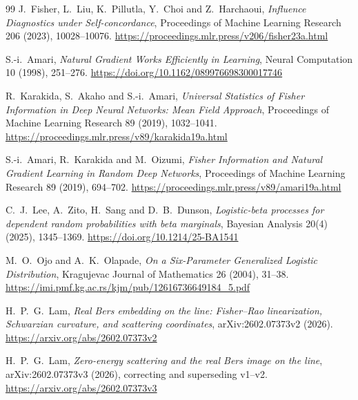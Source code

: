 \documentclass[11pt]{article}
\begin{document}
\begin{thebibliography}{99}
J.~Fisher, L.~Liu, K.~Pillutla, Y.~Choi and Z.~Harchaoui,
\emph{Influence Diagnostics under Self-concordance},
Proceedings of Machine Learning Research 206 (2023), 10028--10076.
\url{https://proceedings.mlr.press/v206/fisher23a.html}

S.-i.~Amari,
\emph{Natural Gradient Works Efficiently in Learning},
Neural Computation 10 (1998), 251--276.
\url{https://doi.org/10.1162/089976698300017746}

R.~Karakida, S.~Akaho and S.-i.~Amari,
\emph{Universal Statistics of Fisher Information in Deep Neural Networks: Mean Field Approach},
Proceedings of Machine Learning Research 89 (2019), 1032--1041.
\url{https://proceedings.mlr.press/v89/karakida19a.html}

S.-i.~Amari, R.~Karakida and M.~Oizumi,
\emph{Fisher Information and Natural Gradient Learning in Random Deep Networks},
Proceedings of Machine Learning Research 89 (2019), 694--702.
\url{https://proceedings.mlr.press/v89/amari19a.html}

C.~J.~Lee, A.~Zito, H.~Sang and D.~B.~Dunson,
\emph{Logistic-beta processes for dependent random probabilities with beta marginals},
Bayesian Analysis 20(4) (2025), 1345--1369.
\url{https://doi.org/10.1214/25-BA1541}

M.~O.~Ojo and A.~K.~Olapade,
\emph{On a Six-Parameter Generalized Logistic Distribution},
Kragujevac Journal of Mathematics 26 (2004), 31--38.
\url{https://imi.pmf.kg.ac.rs/kjm/pub/12616736649184_5.pdf}

H.~P.~G.~Lam,
\emph{Real Bers embedding on the line: Fisher--Rao linearization, Schwarzian curvature, and scattering coordinates},
arXiv:2602.07373v2 (2026).
\url{https://arxiv.org/abs/2602.07373v2}

H.~P.~G.~Lam,
\emph{Zero-energy scattering and the real Bers image on the line},
arXiv:2602.07373v3 (2026), correcting and superseding v1--v2.
\url{https://arxiv.org/abs/2602.07373v3}
\end{thebibliography}
\end{document}
